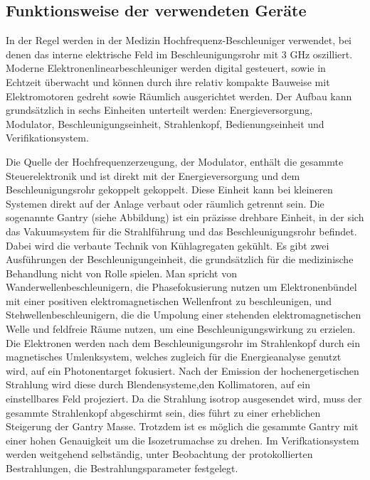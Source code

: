 





\subsection{Funktionsweise der verwendeten Geräte}
In der Regel werden in der Medizin Hochfrequenz-Beschleuniger verwendet, bei denen das interne elektrische Feld 
im Beschleunigungsrohr mit 3 GHz oszilliert. 
Moderne Elektronenlinearbeschleuniger werden digital gesteuert, sowie in Echtzeit überwacht und können durch ihre relativ kompakte Bauweise
mit Elektromotoren gedreht sowie Räumlich ausgerichtet werden.
Der Aufbau kann grundsätzlich in sechs Einheiten unterteilt werden: Energieversorgung, Modulator, Beschleunigungseinheit, Strahlenkopf, Bedienungseinheit und Verifikationsystem. \cite{KriegerHannoSfTu}


Die Quelle der Hochfrequenzerzeugung, der Modulator, enthält die gesammte Steuerelektronik und ist direkt mit der Energieversorgung und dem Beschleunigungsrohr gekoppelt gekoppelt.
Diese Einheit kann bei kleineren Systemen direkt auf der Anlage verbaut oder räumlich getrennt sein.
Die sogenannte Gantry (siehe Abbildung) ist ein präzisse drehbare Einheit, in der sich das Vakuumsystem für die Strahlführung und das Beschleunigungsrohr befindet.
Dabei wird die verbaute Technik von Kühlagregaten gekühlt.
Es gibt zwei Ausführungen der Beschleunigungeinheit, die grundsätzlich für die medizinische Behandlung nicht von Rolle spielen.
Man spricht von Wanderwellenbeschleunigern, die Phasefokusierung nutzen um Elektronenbündel mit einer positiven elektromagnetischen Wellenfront zu beschleunigen,
und Stehwellenbeschleunigern, die die Umpolung einer stehenden elektromagnetischen Welle und feldfreie Räume nutzen, um eine Beschleunigungswirkung zu erzielen.
Die Elektronen werden nach dem Beschleunigungsrohr im Strahlenkopf durch ein magnetisches Umlenksystem, welches zugleich für die Energieanalyse genutzt wird, auf ein Photonentarget fokusiert.
Nach der Emission der hochenergetischen Strahlung wird diese durch Blendensysteme,den Kollimatoren, auf ein einstellbares Feld projeziert.
Da die Strahlung isotrop ausgesendet wird, muss der gesammte Strahlenkopf abgeschirmt sein, dies führt zu einer erheblichen Steigerung der Gantry Masse.
Trotzdem ist es möglich die gesammte Gantry mit einer hohen Genauigkeit um die Isozetrumachse zu drehen.
Im Verifkationsystem werden weitgehend selbständig, unter Beobachtung der protokollierten Bestrahlungen, die Bestrahlungsparameter festgelegt.\cite{KriegerHannoSfTu}



